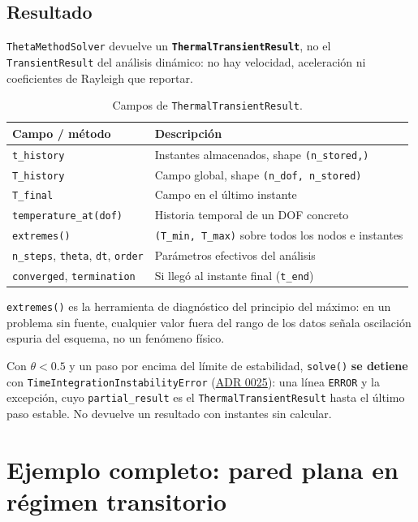 \documentclass[11pt,oneside]{report}
\begin{document}
\subsection{Resultado}

\texttt{ThetaMethodSolver} devuelve un \textbf{\texttt{ThermalTransientResult}}, no el \texttt{TransientResult} del análisis dinámico: no hay velocidad, aceleración ni coeficientes de Rayleigh que reportar.

\begin{table}[h]
\centering
\caption{Campos de \texttt{ThermalTransientResult}.}
\begin{tabularx}{\textwidth}{YY}
\hline
\textbf{Campo / método} & \textbf{Descripción} \\
\hline
\texttt{t\_history} & Instantes almacenados, shape \texttt{(n\_stored,)} \\
\texttt{T\_history} & Campo global, shape \texttt{(n\_\allowbreak{}dof, n\_\allowbreak{}stored)} \\
\texttt{T\_final} & Campo en el último instante \\
\texttt{temperature\_\allowbreak{}at(dof)} & Historia temporal de un DOF concreto \\
\texttt{extremes()} & \texttt{(T\_min, T\_max)} sobre todos los nodos e instantes \\
\texttt{n\_steps}, \texttt{theta}, \texttt{dt}, \texttt{order} & Parámetros efectivos del análisis \\
\texttt{converged}, \texttt{termination} & Si llegó al instante final (\texttt{\textquotedbl{}t\_end\textquotedbl{}}) \\
\hline
\end{tabularx}
\end{table}
\texttt{extremes()} es la herramienta de diagnóstico del principio del máximo: en un problema sin fuente, cualquier valor fuera del rango de los datos señala oscilación espuria del esquema, no un fenómeno físico.

Con $\theta < 0.5$ y un paso por encima del límite de estabilidad, \texttt{solve()} \textbf{se detiene} con \texttt{TimeIntegrationInstabilityError} (\href{https://github.com/jretamav/solidum-fem/blob/main/docs/adr/0025-terminacion-de-los-solvers-incrementales-y-registro.md}{ADR 0025}): una línea \texttt{ERROR} y la excepción, cuyo \texttt{partial\_result} es el \texttt{ThermalTransientResult} hasta el último paso estable. No devuelve un resultado con instantes sin calcular.

\section{Ejemplo completo: pared plana en régimen transitorio}
\end{document}
